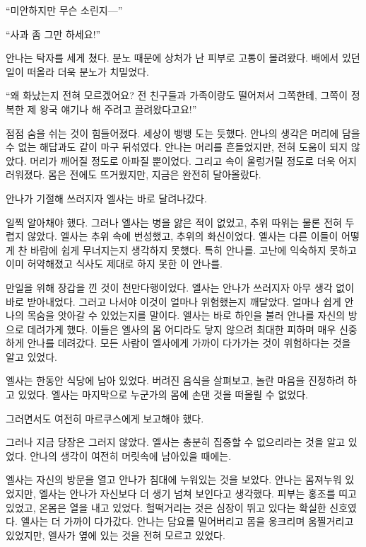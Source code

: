 ``미안하지만 무슨 소린지—''

``사과 좀 그만 하세요!''

안나는 탁자를 세게 쳤다. 분노 때문에 상처가 난 피부로 고통이 몰려왔다. 배에서 있던 일이 떠올라 더욱 분노가 치밀었다.

``왜 화났는지 전혀 모르겠어요? 전 친구들과 가족이랑도 떨어져서 그쪽한테, 그쪽이 정복한 제 왕국 얘기나 해 주려고 끌려왔다고요!''

점점 숨을 쉬는 것이 힘들어졌다. 세상이 뱅뱅 도는 듯했다. 안나의 생각은 머리에 담을 수 없는 해답과도 같이 마구 뒤섞였다. 안나는 머리를 흔들었지만, 전혀 도움이 되지 않았다. 머리가 깨어질 정도로 아파질 뿐이었다. 그리고 속이 울렁거릴 정도로 더욱 어지러워졌다. 몸은 전에도 뜨거웠지만, 지금은 완전히 달아올랐다.

안나가 기절해 쓰러지자 엘사는 바로 달려나갔다.

\textbreak

일찍 알아채야 했다. 그러나 엘사는 병을 앓은 적이 없었고, 추위 따위는 물론 전혀 두렵지 않았다. 엘사는 추위 속에 번성했고, 추위의 화신이었다. 엘사는 다른 이들이 어떻게 찬 바람에 쉽게 무너지는지 생각하지 못했다. 특히 안나를. 고난에 익숙하지 못하고 이미 허약해졌고 식사도 제대로 하지 못한 이 안나를.

만일을 위해 장갑을 낀 것이 천만다행이었다. 엘사는 안나가 쓰러지자 아무 생각 없이 바로 받아내었다. 그러고 나서야 이것이 얼마나 위험했는지 깨달았다. 얼마나 쉽게 안나의 목숨을 앗아갈 수 있었는지를 말이다. 엘사는 바로 하인을 불러 안나를 자신의 방으로 데려가게 했다. 이들은 엘사의 몸 어디라도 닿지 않으려 최대한 피하며 매우 신중하게 안나를 데려갔다. 모든 사람이 엘사에게 가까이 다가가는 것이 위험하다는 것을 알고 있었다.

엘사는 한동안 식당에 남아 있었다. 버려진 음식을 살펴보고, 놀란 마음을 진정하려 하고 있었다. 엘사는 마지막으로 누군가의 몸에 손댄 것을 떠올릴 수 없었다.

그러면서도 여전히 마르쿠스에게 보고해야 했다.

그러나 지금 당장은 그러지 않았다. 엘사는 충분히 집중할 수 없으리라는 것을 알고 있었다. 안나의 생각이 여전히 머릿속에 남아있을 때에는.

엘사는 자신의 방문을 열고 안나가 침대에 누워있는 것을 보았다. 안나는 몸져누워 있었지만, 엘사는 안나가 자신보다 더 생기 넘쳐 보인다고 생각했다. 피부는 홍조를 띠고 있었고, 온몸은 열을 내고 있었다. 헐떡거리는 것은 심장이 뛰고 있다는 확실한 신호였다. 엘사는 더 가까이 다가갔다. 안나는 담요를 밀어버리고 몸을 웅크리며 움찔거리고 있었지만, 엘사가 옆에 있는 것을 전혀 모르고 있었다.

